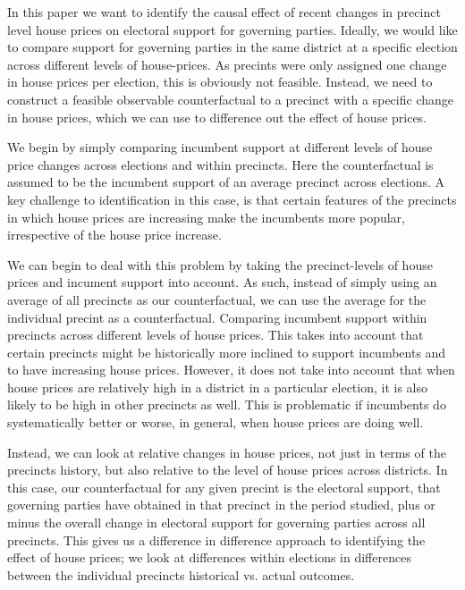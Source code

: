 \documentclass[12pt,a4paper]{article}
\begin{document}
In this paper we want to identify the causal effect of recent changes in precinct level house prices on electoral support for governing parties. Ideally, we would like to compare support for governing parties in the same district at a specific election across different levels of house-prices. As precints were only assigned one change in house prices per election, this is obviously not feasible. Instead, we need to construct a feasible observable counterfactual to a precinct with a specific change in house prices, which we can use to difference out the effect of house prices. 

We begin by simply comparing incumbent support at different levels of house price changes across elections and within precincts. Here the counterfactual is assumed to be the incumbent support of an average precinct across elections. A key challenge to identification in this case, is that certain features of the precincts in which house prices are increasing make the incumbents more popular, irrespective of the house price increase. 

We can begin to deal with this problem by taking the precinct-levels of house prices and incument support into account. As such, instead of simply using an average of all precincts as our counterfactual, we can use the average for the individual precint as a counterfactual. Comparing incumbent support within precincts across different levels of house prices. This takes into account that certain precincts might be historically more inclined to support incumbents and to have increasing house prices. However, it does not take into account that when house prices are relatively high in a district in a particular election, it is also likely to be high in other precincts as well. This is problematic if incumbents do systematically better or worse, in general, when house prices are doing well.

Instead, we can look at relative changes in house prices, not just in terms of the precincts history, but also relative to the level of house prices across districts. In this case, our counterfactual for any given precint is the electoral support, that governing parties have obtained in that precinct in the period studied, plus or minus the overall change in electoral support for governing parties across all precincts. This gives us a difference in difference approach to identifying the effect of house prices; we look at differences within elections in differences between the individual precincts historical vs. actual outcomes.
\end{document}
